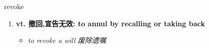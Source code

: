 
\begin{frame}
{\huge revoke}
\begin{center}
\begin{enumerate}\Large
  \item \textbf{vt. 撤回,宣告无效: to annul by recalling or taking back}
  \begin{itemize}
    \item \em{\Large{to revoke a will 废除遗嘱}}
  \end{itemize}
\end{enumerate}
\end{center}
\end{frame}
